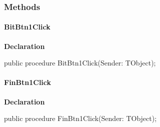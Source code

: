 \documentclass{report}
\newif\ifpdf
\begin{document}
\subsubsection*{\large{\textbf{Methods}}\normalsize\hspace{1ex}\hfill}
\paragraph*{BitBtn1Click}\hspace*{\fill}

\label{dgunit.TDGForm-BitBtn1Click}
\begin{list}{}{
\setlength{\itemindent}{0cm}
\setlength{\listparindent}{0cm}
\setlength{\leftmargin}{\evensidemargin}
\addtolength{\leftmargin}{\tmplength}
\settowidth{\labelsep}{X}
\addtolength{\leftmargin}{\labelsep}
\setlength{\labelwidth}{\tmplength}
}
\item[\textbf{Declaration}\hfill]
\ifpdf
\begin{flushleft}
\fi
\begin{ttfamily}
public procedure BitBtn1Click(Sender: TObject);\end{ttfamily}

\ifpdf
\end{flushleft}
\fi

\end{list}
\paragraph*{FinBtn1Click}\hspace*{\fill}

\label{dgunit.TDGForm-FinBtn1Click}
\begin{list}{}{
\setlength{\itemindent}{0cm}
\setlength{\listparindent}{0cm}
\setlength{\leftmargin}{\evensidemargin}
\addtolength{\leftmargin}{\tmplength}
\settowidth{\labelsep}{X}
\addtolength{\leftmargin}{\labelsep}
\setlength{\labelwidth}{\tmplength}
}
\item[\textbf{Declaration}\hfill]
\ifpdf
\begin{flushleft}
\fi
\begin{ttfamily}
public procedure FinBtn1Click(Sender: TObject);\end{ttfamily}

\ifpdf
\end{flushleft}
\fi

\end{list}
\end{document}
